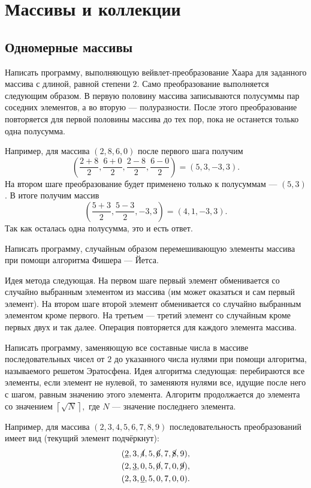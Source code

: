 \section{Массивы и коллекции}


\subsection{Одномерные массивы}

\task Написать программу, выполняющую вейвлет-преобразование Хаара для
заданного массива с длиной, равной степени $2$. Само преобразование
выполняется следующим образом. В первую половину массива записываются
полусуммы пар соседних элементов, а во вторую — полуразности. После
этого преобразование повторяется для первой половины массива до тех
пор, пока не останется только одна полусумма.

Например, для массива $(2, 8, 6, 0)$ после первого шага получим
\[
\left(\frac{2+8}2, \frac{6+0}2, \frac{2-8}2, \frac{6-0}2\right) = (5, 3, -3, 3).
\]
На втором шаге преобразование будет применено только к полусуммам —
$(5, 3)$. В итоге получим массив
\[
\left(\frac{5+3}2, \frac{5-3}2, -3, 3\right) = (4, 1, -3, 3).
\]
Так как осталась одна полусумма, это и есть ответ.

\task Написать программу, случайным образом перемешивающую элементы
массива при помощи алгоритма Фишера — Йетса.

Идея метода следующая. На первом шаге первый элемент обменивается со
случайно выбранным элементом из массива (им может оказаться и сам
первый элемент). На втором шаге второй элемент обменивается со
случайно выбранным элементом кроме первого. На третьем — третий
элемент со случайным кроме первых двух и так далее. Операция
повторяется для каждого элемента массива.

\task Написать программу, заменяющую все составные числа в массиве
последовательных чисел от $2$ до указанного числа нулями при помощи
алгоритма, называемого решетом Эратосфена. Идея алгоритма следующая:
перебираются все элементы, если элемент не нулевой, то заменяютя
нулями все, идущие после него с шагом, равным значению этого
элемента. Алгоритм продолжается до элемента со значением
$\left\lceil\sqrt N\right\rceil,$ где $N$ — значение последнего
элемента.

Например, для массива $(2, 3, 4, 5, 6, 7, 8, 9)$ последовательность
преобразований имеет вид (текущий элемент подчёркнут):
\begin{eqnarray*}
&(\underline2, 3, \cancel4, 5, \cancel6, 7, \cancel8, 9),\\
&(2, \underline3, 0, 5, \cancel0, 7, 0, \cancel9),\\
&(2, 3, \underline0, 5, 0, 7, 0, 0).
\end{eqnarray*}

